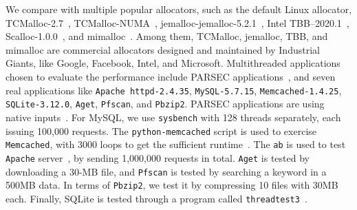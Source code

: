  We compare \NM{} with multiple popular allocators, such as the default Linux allocator, TCMalloc-2.7~\cite{tcmalloc},  TCMalloc-NUMA~\cite{tcmallocnew}, jemalloc-jemalloc-5.2.1~\cite{jemalloc}, Intel TBB--2020.1~\cite{tbb}, Scalloc-1.0.0~\cite{Scalloc}, and mimalloc~\cite{mimalloc}. Among them, TCMalloc, jemalloc, TBB, and mimalloc are commercial allocators designed and maintained by Industrial Giants, like Google, Facebook, Intel, and Microsoft.   
Multithreaded applications chosen to evaluate the performance include PARSEC applications~\cite{parsec}, and seven real applications like \texttt{Apache httpd-2.4.35}, \texttt{MySQL-5.7.15}, \texttt{Memcached-1.4.25}, \texttt{SQLite-3.12.0}, \texttt{Aget}, \texttt{Pfscan}, and \texttt{Pbzip2}. 
PARSEC applications are using native inputs~\cite{parsec}. For MySQL, we use \texttt{sysbench} with 128 threads separately, each issuing 100,000 requests. The \texttt{python-memcached} script is used to exercise \texttt{Memcached}, with 3000 loops to get the sufficient runtime~\cite{memcached}. The \texttt{ab} is used to test \texttt{Apache} server~\cite{apachetest}, by sending 1,000,000 requests in total. \texttt{Aget} is tested by downloading a 30-MB file, and \texttt{Pfscan} is tested by searching  a keyword in a 500MB data. In terms of \texttt{Pbzip2}, we test it by compressing 10 files with 30MB each. Finally, SQLite is tested through a program called \texttt{threadtest3}~\cite{sqlitetest}. 



